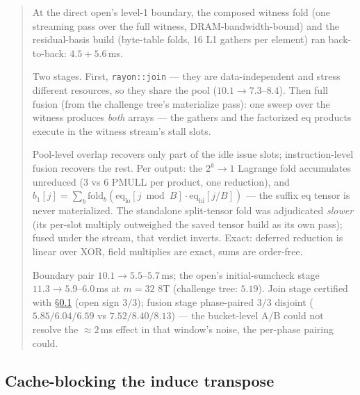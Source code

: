 \documentclass[11pt]{article}
\newcommand{\code}[1]{\texttt{#1}}
\newenvironment{optsummary}{%
  \begin{quote}\small
  \begin{description}
  \setlength{\itemsep}{1pt}\setlength{\parsep}{0pt}\setlength{\topsep}{2pt}
}{%
  \end{description}
  \end{quote}
}
\begin{document}
\begin{optsummary}
\item[Baseline:] At the direct open's level-1 boundary, the composed witness fold (one streaming pass over the full witness, DRAM-bandwidth-bound) and the residual-basis build (byte-table folds, 16 L1 gathers per element) ran back-to-back: $4.5 + 5.6\,$ms.
\item[Improvement:] Two stages. First, \code{rayon::join} — they are data-independent and stress different resources, so they share the pool ($10.1\to7.3$--$8.4$). Then full fusion (from the challenge tree's materialize pass): one sweep over the witness produces \emph{both} arrays — the gathers and the factorized eq products execute in the witness stream's stall slots.
\item[Mechanism:] Pool-level overlap recovers only part of the idle issue slots; instruction-level fusion recovers the rest. Per output: the $2^k{\to}1$ Lagrange fold accumulates unreduced (3 vs 6 PMULL per product, one reduction), and $b_1[j] = \sum_b \mathrm{fold}_b(\mathrm{eq}_{\mathrm{lo}}[j \bmod B]\cdot\mathrm{eq}_{\mathrm{hi}}[j/B])$ — the suffix eq tensor is never materialized. The standalone split-tensor fold was adjudicated \emph{slower} (its per-slot multiply outweighed the saved tensor build as its own pass); fused under the stream, that verdict inverts. Exact: deferred reduction is linear over XOR, field multiplies are exact, sums are order-free.
\item[Result:] Boundary pair $10.1\to5.5$--$5.7\,$ms; the open's initial-sumcheck stage $11.3\to5.9$--$6.0\,$ms at $m{=}32$ 8T (challenge tree: $5.19$). Join stage certified with \S\ref{sec:blockedtranspose} (open sign $3/3$); fusion stage phase-paired $3/3$ disjoint ($5.85/6.04/6.59$ vs $7.52/8.40/8.13$) — the bucket-level A/B could not resolve the $\approx2\,$ms effect in that window's noise, the per-phase pairing could.
\end{optsummary}

\subsection{Cache-blocking the induce transpose}
\label{sec:blockedtranspose}
\end{document}
